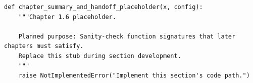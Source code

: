 \begin{lstlisting}[style=bookpython,caption={Planned code placeholder for chapter summary and handoff.},label={lst:ch01-chapter-summary-and-handoff}]
def chapter_summary_and_handoff_placeholder(x, config):
    """Chapter 1.6 placeholder.

    Planned purpose: Sanity-check function signatures that later chapters must satisfy.
    Replace this stub during section development.
    """
    raise NotImplementedError("Implement this section's code path.")
\end{lstlisting}

